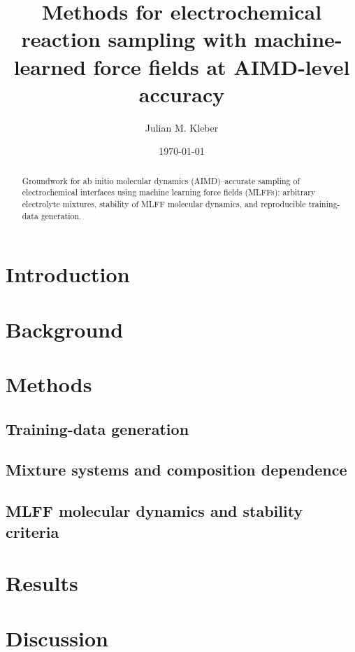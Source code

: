 \documentclass[11pt,a4paper]{article}
\title{Methods for electrochemical reaction sampling with machine-learned force fields at AIMD-level accuracy}
\author{Julian M. Kleber}
\date{\today}
\begin{document}
\maketitle

\begin{abstract}
  Groundwork for ab initio molecular dynamics (AIMD)--accurate sampling of electrochemical interfaces using machine learning force fields (MLFFs): arbitrary electrolyte mixtures, stability of MLFF molecular dynamics, and reproducible training-data generation.
\end{abstract}

\section{Introduction}
\label{sec:intro}

\section{Background}
\label{sec:background}

\section{Methods}
\label{sec:methods}
\subsection{Training-data generation}
\label{sec:data}
\subsection{Mixture systems and composition dependence}
\label{sec:mixtures}
\subsection{MLFF molecular dynamics and stability criteria}
\label{sec:stability}

\section{Results}
\label{sec:results}

\section{Discussion}
\label{sec:discussion}
\end{document}
